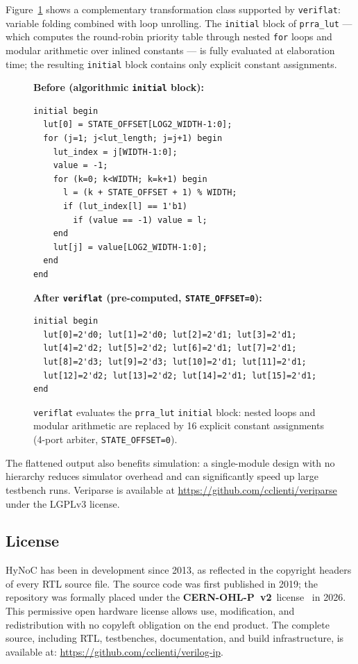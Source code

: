 Figure~\ref{fig:veriflat-prra} shows a complementary transformation class
supported by \texttt{veriflat}: variable folding combined with loop unrolling.
The \texttt{initial} block of \texttt{prra\_lut} — which computes the
round-robin priority table through nested \texttt{for} loops and modular
arithmetic over inlined constants — is fully evaluated at elaboration time;
the resulting \texttt{initial} block contains only explicit constant assignments.

\begin{figure}[t]
\textbf{Before (algorithmic \texttt{initial} block):}
\begin{lstlisting}
initial begin
  lut[0] = STATE_OFFSET[LOG2_WIDTH-1:0];
  for (j=1; j<lut_length; j=j+1) begin
    lut_index = j[WIDTH-1:0];
    value = -1;
    for (k=0; k<WIDTH; k=k+1) begin
      l = (k + STATE_OFFSET + 1) % WIDTH;
      if (lut_index[l] == 1'b1)
        if (value == -1) value = l;
    end
    lut[j] = value[LOG2_WIDTH-1:0];
  end
end
\end{lstlisting}
\textbf{After \texttt{veriflat} (pre-computed, \texttt{STATE\_OFFSET=0}):}
\begin{lstlisting}
initial begin
  lut[0]=2'd0; lut[1]=2'd0; lut[2]=2'd1; lut[3]=2'd1;
  lut[4]=2'd2; lut[5]=2'd2; lut[6]=2'd1; lut[7]=2'd1;
  lut[8]=2'd3; lut[9]=2'd3; lut[10]=2'd1; lut[11]=2'd1;
  lut[12]=2'd2; lut[13]=2'd2; lut[14]=2'd1; lut[15]=2'd1;
end
\end{lstlisting}
\caption{\texttt{veriflat} evaluates the \texttt{prra\_lut} \texttt{initial}
         block: nested loops and modular arithmetic are replaced by 16 explicit
         constant assignments (4-port arbiter, \texttt{STATE\_OFFSET=0}).}
\label{fig:veriflat-prra}
\end{figure}

The flattened output also benefits simulation: a single-module design with no
hierarchy reduces simulator overhead and can significantly speed up large testbench
runs. Veriparse is available at \url{https://github.com/cclienti/veriparse} under
the LGPLv3 license.

\subsection{License}

HyNoC has been in development since 2013, as reflected in the copyright headers
of every RTL source file. The source code was first published in 2019; the
repository was formally placed under the
\textbf{CERN-OHL-P~v2}~license~\cite{cernohl} in 2026. This permissive open
hardware license allows use, modification, and redistribution with no copyleft
obligation on the end product. The complete source, including RTL, testbenches,
documentation, and build infrastructure, is available at:
\url{https://github.com/cclienti/verilog-ip}.
